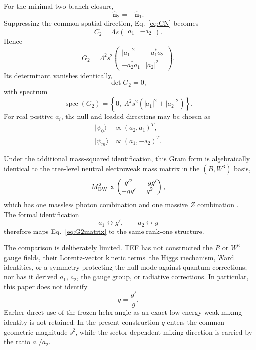 \documentclass[10pt]{article}
\newcommand{\spec}{\operatorname{spec}}
\begin{document}
For the minimal two-branch closure,
\begin{equation}
\hat{\bm n}_2=-\hat{\bm n}_1.
\end{equation}
Suppressing the common spatial direction, Eq.~\eqref{eq:CN} becomes
\begin{equation}
C_2
=
\Lambda s
\begin{pmatrix}
a_1&-a_2
\end{pmatrix}.
\label{eq:C2}
\end{equation}
Hence
\begin{equation}
\boxed{
G_2
=
\Lambda^2s^2
\begin{pmatrix}
|a_1|^2&-a_1^*a_2\\
-a_2^*a_1&|a_2|^2
\end{pmatrix}.
}
\label{eq:G2matrix}
\end{equation}
Its determinant vanishes identically,
\begin{equation}
\det G_2=0,
\end{equation}
with spectrum
\begin{equation}
\spec(G_2)
=
\left\{0,\;
\Lambda^2s^2(|a_1|^2+|a_2|^2)
\right\}.
\label{eq:G2spectrum}
\end{equation}
For real positive $a_i$, the null and loaded directions may be chosen as
\begin{align}
|\psi_0\rangle
&\propto(a_2,a_1)^T,
\\
|\psi_m\rangle
&\propto(a_1,-a_2)^T.
\label{eq:twomodes}
\end{align}

Under the additional mass-squared identification, this Gram form is algebraically identical to the tree-level neutral electroweak mass matrix in the $(B,W^3)$ basis,
\begin{equation}
M_{\rm EW}^2
\propto
\begin{pmatrix}
g'^2&-gg'\\-gg'&g^2\end{pmatrix},
\label{eq:EWmatrix}
\end{equation}
which has one massless photon combination and one massive $Z$ combination \cite{ErlerFreitas2024}. The formal identification
\begin{equation}
a_1\leftrightarrow g',
\qquad
a_2\leftrightarrow g
\end{equation}
therefore maps Eq.~\eqref{eq:G2matrix} to the same rank-one structure.

The comparison is deliberately limited. TEF has not constructed the $B$ or $W^3$ gauge fields, their Lorentz-vector kinetic terms, the Higgs mechanism, Ward identities, or a symmetry protecting the null mode against quantum corrections; nor has it derived $a_1$, $a_2$, the gauge group, or radiative corrections. In particular, this paper does not identify
\begin{equation}
q=\frac{g'}{g}.
\end{equation}
Earlier direct use of the frozen helix angle as an exact low-energy weak-mixing identity is not retained. In the present construction $q$ enters the common geometric magnitude $s^2$, while the sector-dependent mixing direction is carried by the ratio $a_1/a_2$.
\end{document}
